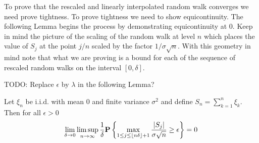 To prove that the rescaled and linearly interpolated random walk converges we need
prove tightness.  To prove tightness we need to show equicontinuity.
The following Lemma begins the process by demonstrating equicontinuity
at $0$.  Keep in mind the picture of the scaling of the random walk at
level $n$
which places the value of $S_j$ at the point $j/n$ scaled by the
factor $1/\sigma\sqrt{n}$.  With this geometry in mind note that what
we are proving is a bound for each of the sequence of rescaled random
walks on the interval $[0,\delta]$.

TODO: Replace $\epsilon$ by $\lambda$ in the following Lemma?
\begin{lem}\label{RandomWalkEquicontinuityAt0} Let $\xi_n$ be i.i.d. with mean $0$ and finite variance
  $\sigma^2$ and define $S_n = \sum_{k=1}^n \xi_k$.  Then for all
  $\epsilon > 0$ 
\begin{align*}
\lim_{\delta \to 0} \limsup_{n \to \infty} \frac{1}{\delta}
\textbf{P}\left \{\max_{1 \leq j \leq \left \lfloor n\delta \right \rfloor+1} \frac{\left \vert S_j \right \vert}{\sigma\sqrt{n}} \geq
  \epsilon \right \} = 0
\end{align*}
\end{lem}
